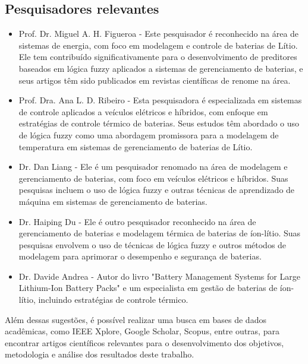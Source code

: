 \subsection{Pesquisadores relevantes}
\begin{itemize}
    \item Prof. Dr. Miguel A. H. Figueroa - Este pesquisador é reconhecido na área de sistemas de energia, com foco em modelagem e controle de baterias de Lítio. Ele tem contribuído significativamente para o desenvolvimento de preditores baseados em lógica fuzzy aplicados a sistemas de gerenciamento de baterias, e seus artigos têm sido publicados em revistas científicas de renome na área.

    \item Prof. Dra. Ana L. D. Ribeiro - Esta pesquisadora é especializada em sistemas de controle aplicados a veículos elétricos e híbridos, com enfoque em estratégias de controle térmico de baterias. Seus estudos têm abordado o uso de lógica fuzzy como uma abordagem promissora para a modelagem de temperatura em sistemas de gerenciamento de baterias de Lítio.

    \item Dr. Dan Liang - Ele é um pesquisador renomado na área de modelagem e gerenciamento de baterias, com foco em veículos elétricos e híbridos. Suas pesquisas incluem o uso de lógica fuzzy e outras técnicas de aprendizado de máquina em sistemas de gerenciamento de baterias.

    \item Dr. Haiping Du - Ele é outro pesquisador reconhecido na área de gerenciamento de baterias e modelagem térmica de baterias de íon-lítio. Suas pesquisas envolvem o uso de técnicas de lógica fuzzy e outros métodos de modelagem para aprimorar o desempenho e segurança de baterias.

    \item Dr. Davide Andrea - Autor do livro "Battery Management Systems for Large Lithium-Ion Battery Packs" e um especialista em gestão de baterias de íon-lítio, incluindo estratégias de controle térmico.
\end{itemize}
Além dessas sugestões, é possível realizar uma busca em bases de dados acadêmicas, como IEEE Xplore, Google Scholar, Scopus, entre outras, para encontrar artigos científicos relevantes para o desenvolvimento dos objetivos, metodologia e análise dos resultados deste trabalho.